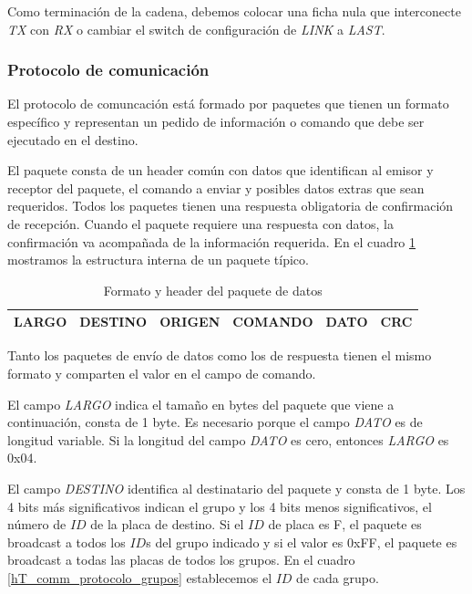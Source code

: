Como terminaci\'on de la cadena, debemos colocar una ficha nula que interconecte \emph{TX} con \emph{RX} o
cambiar el switch de configuraci\'on de \emph{LINK} a \emph{LAST}.

\subsubsection{Protocolo de comunicaci\'on}
\label{h_comm_protocolo}

El protocolo de comuncaci\'on est\'a formado por paquetes que tienen un formato espec\'ifico y representan un pedido de
informaci\'on o comando que debe ser ejecutado en el destino.

El paquete consta de un header com\'un con datos que identifican al emisor y receptor del paquete, el comando a enviar y
posibles datos extras que sean requeridos.
Todos los paquetes tienen una respuesta obligatoria de confirmaci\'on de recepci\'on.
Cuando el paquete requiere una respuesta con datos, la confirmaci\'on va acompa\~nada de la informaci\'on requerida.
En el cuadro \ref{hF_comm_paquete_tabla} mostramos la estructura interna de un paquete t\'ipico.

\begin{table}[h]
	\begin{center}
		\begin{tabular}{|c|c|c|c|c|c|}
			\hline
			LARGO & DESTINO & ORIGEN & COMANDO & DATO & CRC \\
			\hline
		\end{tabular}
	\caption{Formato y header del paquete de datos}
	\label{hF_comm_paquete_tabla}
	\end{center}
\end{table}

Tanto los paquetes de env\'io de datos como los de respuesta tienen el mismo formato y comparten el valor en el campo de comando.

El campo \emph{LARGO} indica el tama\~no en bytes del paquete que viene a continuaci\'on, consta de 1 byte.
Es necesario porque el campo \emph{DATO} es de longitud variable.
Si la longitud del campo \emph{DATO} es cero, entonces \emph{LARGO} es 0x04.

El campo \emph{DESTINO} identifica al destinatario del paquete y consta de 1 byte.
Los 4 bits m\'as significativos indican el grupo y los 4 bits menos significativos, el n\'umero de $ID$ de la placa de destino.
Si el $ID$ de placa es F, el paquete es broadcast a todos los $ID$s del grupo indicado y si el valor es 0xFF, el paquete
es broadcast a todas las placas de todos los grupos.
En el cuadro \ref{hT_comm_protocolo_grupos} establecemos el $ID$ de cada grupo.

